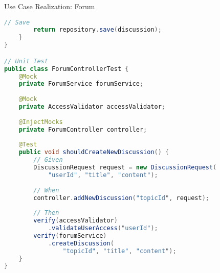 \begin{example2}{Use Case Realization: Forum}
\begin{lstlisting}[language=Java, style=basesmol]
        // Save
        return repository.save(discussion);
    }
}

// Unit Test
public class ForumControllerTest {
    @Mock
    private ForumService forumService;
    
    @Mock
    private AccessValidator accessValidator;
    
    @InjectMocks
    private ForumController controller;
    
    @Test
    public void shouldCreateNewDiscussion() {
        // Given
        DiscussionRequest request = new DiscussionRequest(
            "userId", "title", "content");
        
        // When
        controller.addNewDiscussion("topicId", request);
        
        // Then
        verify(accessValidator)
            .validateUserAccess("userId");
        verify(forumService)
            .createDiscussion(
                "topicId", "title", "content");
    }
}
\end{lstlisting}
\end{example2}

